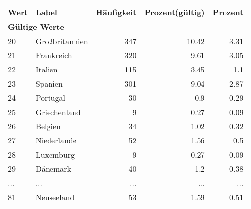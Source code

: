      \begin{longtable}{lXrrr}
     \toprule
     \textbf{Wert} & \textbf{Label} & \textbf{Häufigkeit} & \textbf{Prozent(gültig)} & \textbf{Prozent} \\
     \endhead
     \midrule
     \multicolumn{5}{l}{\textbf{Gültige Werte}}\\
        20 & \multicolumn{1}{X}{Großbritannien} & %
          \num{347} &
          \num[round-mode=places,round-precision=2]{10.42} &
          \num[round-mode=places,round-precision=2]{3.31} \\
        21 & \multicolumn{1}{X}{Frankreich} & %
          \num{320} &
          \num[round-mode=places,round-precision=2]{9.61} &
          \num[round-mode=places,round-precision=2]{3.05} \\
        22 & \multicolumn{1}{X}{Italien} & %
          \num{115} &
          \num[round-mode=places,round-precision=2]{3.45} &
          \num[round-mode=places,round-precision=2]{1.1} \\
        23 & \multicolumn{1}{X}{Spanien} & %
          \num{301} &
          \num[round-mode=places,round-precision=2]{9.04} &
          \num[round-mode=places,round-precision=2]{2.87} \\
        24 & \multicolumn{1}{X}{Portugal} & %
          \num{30} &
          \num[round-mode=places,round-precision=2]{0.9} &
          \num[round-mode=places,round-precision=2]{0.29} \\
        25 & \multicolumn{1}{X}{Griechenland} & %
          \num{9} &
          \num[round-mode=places,round-precision=2]{0.27} &
          \num[round-mode=places,round-precision=2]{0.09} \\
        26 & \multicolumn{1}{X}{Belgien} & %
          \num{34} &
          \num[round-mode=places,round-precision=2]{1.02} &
          \num[round-mode=places,round-precision=2]{0.32} \\
        27 & \multicolumn{1}{X}{Niederlande} & %
          \num{52} &
          \num[round-mode=places,round-precision=2]{1.56} &
          \num[round-mode=places,round-precision=2]{0.5} \\
        28 & \multicolumn{1}{X}{Luxemburg} & %
          \num{9} &
          \num[round-mode=places,round-precision=2]{0.27} &
          \num[round-mode=places,round-precision=2]{0.09} \\
        29 & \multicolumn{1}{X}{Dänemark} & %
          \num{40} &
          \num[round-mode=places,round-precision=2]{1.2} &
          \num[round-mode=places,round-precision=2]{0.38} \\
       ... & ... & ... & ... & ... \\
        81 & \multicolumn{1}{X}{Neuseeland} & %
          \num{53} &
          \num[round-mode=places,round-precision=2]{1.59} &
          \num[round-mode=places,round-precision=2]{0.51} \\


\end{longtable}
